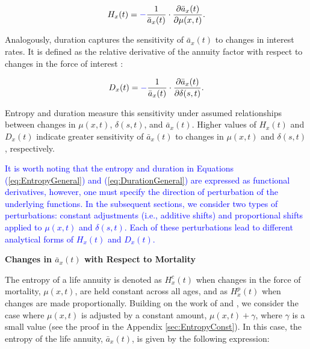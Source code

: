 \documentclass[12pt]{article}
\newcommand{\revision}[1]{\textcolor{blue}{#1}}
\begin{document}
\begin{equation}\label{eq:EntropyGeneral}
{H}_{x}(t) = \revision{-}\frac{ 1}{\bar{a}_x(t)}\cdot \frac{\partial \bar{a}_x(t) }{\partial \mu(x,t)}.
\end{equation}

Analogously, duration captures the sensitivity of $\bar{a}_x(t)$ to changes in interest rates. It is defined as the relative derivative of the annuity factor with respect to changes in the force of interest \citep{milevsky2013life,Milevsky2012a}:


\begin{equation}\label{eq:DurationGeneral}
{D}_{x}(t) = \revision{-}\frac{1}{\bar{a}_x(t)}\cdot  \frac{\partial \bar{a}_x(t) }{\partial \delta(s,t)}.
\end{equation}



Entropy and duration measure this sensitivity under assumed relationships between changes in $\mu(x,t)$, $\delta(s,t)$, and $\bar{a}_x(t)$. Higher values of ${H}_{x}(t)$ and ${D}_{x}(t)$ indicate greater sensitivity of $\bar{a}_x(t)$ to changes in $\mu(x,t)$ and $\delta(s,t)$, respectively. 

\textcolor{blue}{It is worth noting that the entropy and duration in Equations (\ref{eq:EntropyGeneral}) and (\ref{eq:DurationGeneral}) are expressed as functional derivatives, however, one must specify the direction of perturbation of the underlying functions. In the subsequent sections, we consider two types of perturbations: constant adjustments (i.e., additive shifts) and proportional shifts applied to $\mu(x,t)$ and $\delta(s,t)$. Each of these perturbations lead to different analytical forms of ${H}_{x}(t)$ and ${D}_{x}(t)$. }

\textbf{{Changes in $\bar{a}_x(t)$ with Respect to Mortality}}


The entropy of a life annuity is denoted as ${H}^{c}_{x}(t)$ when changes in the force of mortality, $\mu(x,t)$, are held constant across all ages, and as ${H}^{p}_{x}(t)$ when changes are made proportionally. Building on the work of \citet{Tsai2013a} and \citet{Lin2020}, we consider the case where $\mu(x,t)$ is adjusted by a constant amount, $\mu(x,t) + \gamma$, where $\gamma$ is a small value (see the proof in the Appendix \ref{sec:EntropyConst}). In this case, the entropy of the life annuity, $\bar{a}_x(t)$, is given by the following expression:
\end{document}
